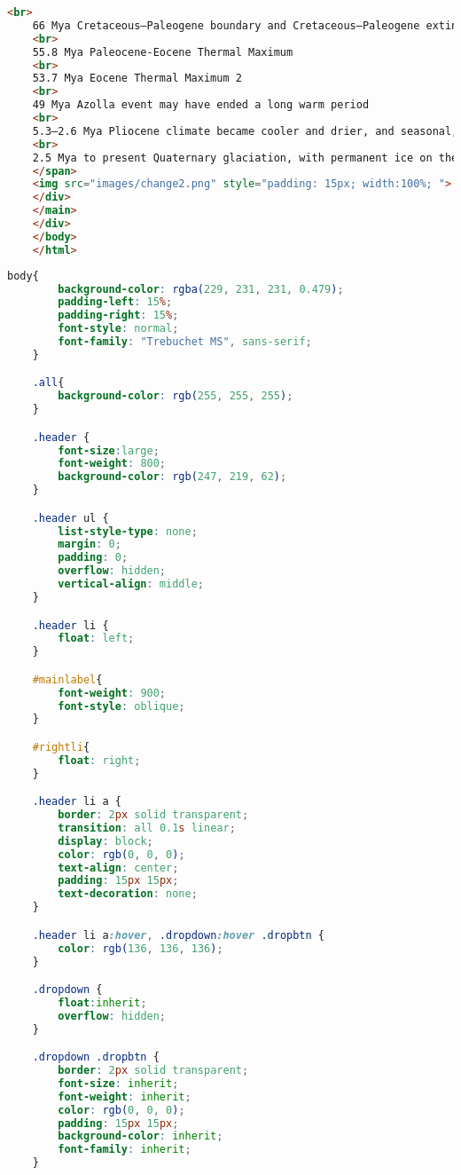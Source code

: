 \begin{lstlisting}[language=HTML,caption=Исходный код страницы History]
    <br>
    66 Mya Cretaceous–Paleogene boundary and Cretaceous–Paleogene extinction event, extinction of dinosaurs
    <br>
    55.8 Mya Paleocene-Eocene Thermal Maximum
    <br>
    53.7 Mya Eocene Thermal Maximum 2
    <br>
    49 Mya Azolla event may have ended a long warm period
    <br>
    5.3–2.6 Mya Pliocene climate became cooler and drier, and seasonal, similar to modern climates.
    <br>
    2.5 Mya to present Quaternary glaciation, with permanent ice on the polar regions, many named stages in different parts of the world
    </span>
    <img src="images/change2.png" style="padding: 15px; width:100%; ">
    </div>
    </main>
    </div>
    </body>
    </html>
\end{lstlisting}



\begin{lstlisting}[language=CSS,caption=Исходный код стилей CSS]
    body{
        background-color: rgba(229, 231, 231, 0.479);
        padding-left: 15%;
        padding-right: 15%;
        font-style: normal;
        font-family: "Trebuchet MS", sans-serif;
    }

    .all{
        background-color: rgb(255, 255, 255);
    }

    .header {
        font-size:large;
        font-weight: 800;
        background-color: rgb(247, 219, 62);
    }

    .header ul {
        list-style-type: none;
        margin: 0;
        padding: 0;
        overflow: hidden;
        vertical-align: middle;
    }

    .header li {
        float: left;
    }

    #mainlabel{
        font-weight: 900;
        font-style: oblique;
    }

    #rightli{
        float: right;
    }

    .header li a {
        border: 2px solid transparent;
        transition: all 0.1s linear;
        display: block;
        color: rgb(0, 0, 0);
        text-align: center;
        padding: 15px 15px;
        text-decoration: none;
    }

    .header li a:hover, .dropdown:hover .dropbtn {
        color: rgb(136, 136, 136);
    }

    .dropdown {
        float:inherit;
        overflow: hidden;
    }

    .dropdown .dropbtn {
        border: 2px solid transparent;
        font-size: inherit;
        font-weight: inherit;
        color: rgb(0, 0, 0);
        padding: 15px 15px;
        background-color: inherit;
        font-family: inherit;
    }


\end{lstlisting}
